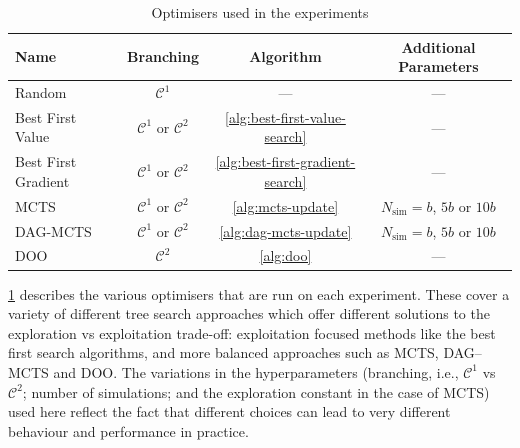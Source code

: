 \documentclass[10pt]{article}
\theoremstyle{definition}
\begin{document}
\begin{table}[t]
    \centering
    \begin{tabular}{|l|c|c|c|}
        \hline
        Name & Branching & Algorithm & Additional Parameters \\
        \hline
        Random & $\mathcal{C}^1$ & --- & --- \\
        Best First Value & $\mathcal{C}^1$ or $\mathcal{C}^2$ & \cref{alg:best-first-value-search} & --- \\ 
        Best First Gradient & $\mathcal{C}^1$ or $\mathcal{C}^2$ & \cref{alg:best-first-gradient-search} & --- \\ 
        MCTS & $\mathcal{C}^1$ or $\mathcal{C}^2$ & \cref{alg:mcts-update} & $N_\mathrm{sim} = b$, $5b$ or $10b$ \\
        DAG-MCTS & $\mathcal{C}^1$ or $\mathcal{C}^2$ & \cref{alg:dag-mcts-update} & $N_\mathrm{sim} = b$, $5b$ or $10b$ \\
        DOO & $\mathcal{C}^2$ & \cref{alg:doo} & --- \\ 
        \hline
    \end{tabular}
    \caption{Optimisers used in the experiments}
    \label{table:experiment-optimisers}
\end{table}

\cref{table:experiment-optimisers} describes the various optimisers that are run on each experiment. These cover a variety of different tree search approaches which offer different solutions to the exploration vs exploitation trade-off: exploitation focused methods like the best first search algorithms, and more balanced approaches such as MCTS, DAG--MCTS and DOO. The variations in the hyperparameters (branching, i.e., $\mathcal{C} ^ 1$ vs $\mathcal{C} ^ 2$; number of simulations; and the exploration constant in the case of MCTS) used here reflect the fact that different choices can lead to very different behaviour and performance in practice.
\end{document}

